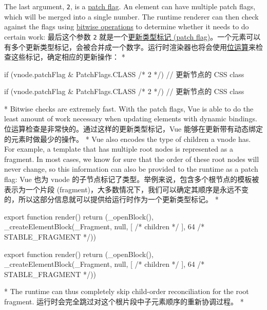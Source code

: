 \begin{paracol}{2}
The last argument, \texttt{2}, is a
\href{https://github.com/vuejs/core/blob/main/packages/shared/src/patchFlags.ts}{patch
flag}. An element can have multiple patch flags, which will be merged
into a single number. The runtime renderer can then check against the
flags using
\href{https://en.wikipedia.org/wiki/Bitwise_operation}{bitwise
operations} to determine whether it needs to do certain work:
\switchcolumn
最后这个参数 \texttt{2}
就是一个\href{https://github.com/vuejs/core/blob/main/packages/shared/src/patchFlags.ts}{更新类型标记
(patch
flag)}。一个元素可以有多个更新类型标记，会被合并成一个数字。运行时渲染器也将会使用\href{https://en.wikipedia.org/wiki/Bitwise_operation}{位运算}来检查这些标记，确定相应的更新操作：
\switchcolumn[0]*%
\begin{codeJs}
if (vnode.patchFlag & PatchFlags.CLASS /* 2 */) {
  // 更新节点的 CSS class
}
\end{codeJs}
\switchcolumn
\begin{codeJs}
if (vnode.patchFlag & PatchFlags.CLASS /* 2 */) {
  // 更新节点的 CSS class
}
\end{codeJs}
\switchcolumn[0]*%
Bitwise checks are extremely fast. With the patch flags, Vue is able to
do the least amount of work necessary when updating elements with
dynamic bindings.
\switchcolumn
位运算检查是非常快的。通过这样的更新类型标记，Vue
能够在更新带有动态绑定的元素时做最少的操作。
\switchcolumn[0]*%
Vue also encodes the type of children a vnode has. For example, a
template that has multiple root nodes is represented as a fragment. In
most cases, we know for sure that the order of these root nodes will
never change, so this information can also be provided to the runtime as
a patch flag:
\switchcolumn
Vue 也为 vnode
的子节点标记了类型。举例来说，包含多个根节点的模板被表示为一个片段
(fragment)，大多数情况下，我们可以确定其顺序是永远不变的，所以这部分信息就可以提供给运行时作为一个更新类型标记。
\switchcolumn[0]*%
\begin{codeJs}
export function render() {
  return (_openBlock(), _createElementBlock(_Fragment, null, [
    /* children */
  ], 64 /* STABLE_FRAGMENT */))
}
\end{codeJs}
\switchcolumn
\begin{codeJs}
export function render() {
  return (_openBlock(), _createElementBlock(_Fragment, null, [
    /* children */
  ], 64 /* STABLE_FRAGMENT */))
}
\end{codeJs}
\switchcolumn[0]*%
The runtime can thus completely skip child-order reconciliation for the
root fragment.
\switchcolumn
运行时会完全跳过对这个根片段中子元素顺序的重新协调过程。
\switchcolumn[0]*%

\end{paracol}

